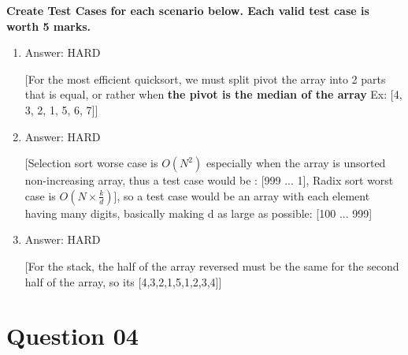 \documentclass{article}
\begin{document}
\textbf{Create Test Cases for each scenario below. Each valid test case is worth 5 marks.}

\begin{enumerate}[label=(\arabic*)]

\item Answer: HARD

[For the most efficient quicksort, we must split pivot the array into 2 parts that is equal, or rather when \textbf{the pivot is the median of the array} Ex: [4, 3, 2, 1, 5, 6, 7]]
\item Answer: HARD

[Selection sort worse case is $O(N^2)$ especially when the array is unsorted non-increasing array, thus a test case would be : [999 ... 1], Radix sort worst case is $O(N \times \frac{k}d)$], so a test case would be an array with each element having many digits, basically making d as large as possible: [100 ... 999]
\item Answer: HARD

[For the stack, the half of the array reversed must be the same for the second half of the array,
so its [4,3,2,1,5,1,2,3,4]]
 
\end{enumerate}

\section{Question 04}
\end{document}
